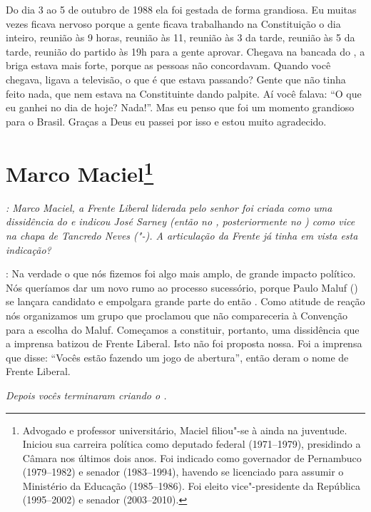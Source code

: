 Do dia 3 ao 5 de outubro de 1988 ela foi gestada de forma grandiosa. Eu
muitas vezes ficava nervoso porque a gente ficava trabalhando na
Constituição o dia inteiro, reunião às 9 horas, reunião às 11, reunião
às 3 da tarde, reunião às 5 da tarde, reunião do partido às 19h para a
gente aprovar. Chegava na bancada do , a briga estava mais forte,
porque as pessoas não concordavam. Quando você chegava, ligava a
televisão, o que é que estava passando? Gente que não tinha feito nada,
que nem estava na Constituinte dando palpite. Aí você falava: ``O que eu
ganhei no dia de hoje? Nada!''. Mas eu penso que foi um momento
grandioso para o Brasil. Graças a Deus eu passei por isso e estou muito
agradecido.

\chapter{Marco Maciel\footnote{Advogado e professor universitário, Maciel filiou"-se à  ainda na
juventude. Iniciou sua carreira política como deputado federal
(1971--1979), presidindo a Câmara nos últimos dois anos. Foi indicado
como governador de Pernambuco (1979--1982) e senador (1983--1994), havendo
se licenciado para assumir o Ministério da Educação (1985--1986). Foi
eleito vice"-presidente da República (1995--2002) e senador (2003--2010).}}

\emph{: Marco Maciel, a Frente Liberal liderada pelo senhor foi criada
como uma dissidência do  e indicou José Sarney (então no ,
posteriormente no ) como vice na chapa de Tancredo Neves
("-). A articulação da Frente já tinha em vista
esta indicação?}

: Na verdade o que nós fizemos foi algo mais amplo,
de grande impacto político. Nós queríamos dar um novo rumo ao processo
sucessório, porque Paulo Maluf () se lançara candidato e empolgara
grande parte do então . Como atitude de reação nós organizamos um
grupo que proclamou que não compareceria à Convenção para a escolha do
Maluf. Começamos a constituir, portanto, uma dissidência que a imprensa
batizou de Frente Liberal. Isto não foi proposta nossa. Foi a imprensa
que disse: ``Vocês estão fazendo um jogo de abertura'', então deram o
nome de Frente Liberal.

\medskip

\noindent\emph{Depois vocês terminaram criando o .}

